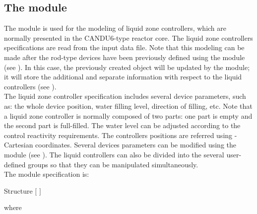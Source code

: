 \subsection{The  module}\label{sect:lzc}

The  module is used for the modeling of liquid zone controllers, which
are normally presented in the CANDU6-type reactor core. The liquid zone controllers
specifications are read from the input data file. Note that this modeling can be made
after the rod-type devices have been previously defined using the 
module (see ). In this case, the previously created  object
will be updated by the  module; it will store the additional and separate
information with respect to the liquid controllers (see ). \\

The liquid zone controller specification includes several device parameters, such as:
the whole device position, water filling level, direction of filling, etc. Note that a liquid
zone controller is normally composed of two parts: one part is empty and the second
part is full-filled. The water level can be adjusted according to the control reactivity
requirements. The controllers positions are referred using -Cartesian
coordinates. Several devices parameters can be modified using the 
module (see ). The liquid controllers can also be divided into the several
user-defined groups so that they can be manipulated simultaneously.\\

\noindent
The  module specification is:

\begin{DataStructure}{Structure }
  \moc{:=} 
$[$  $]$  \moc{::} 
\end{DataStructure}

\noindent where

